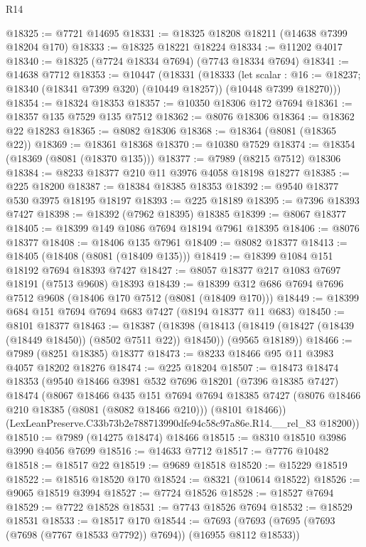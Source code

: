 \begin{lexlean}{R14}
\begin{coremodule}
@18325 := @7721 @14695
@18331 := @18325 @18208 @18211 (@14638 @7399 @18204 @170)
@18333 := @18325 @18221 @18224
@18334 := @11202 @4017
@18340 := @18325 (@7724 @18334 @7694) (@7743 @18334 @7694)
@18341 := @14638 @7712
@18353 := @10447
    (@18331
      (@18333
        (let scalar : @16 := @18237; @18340 (@18341 @7399 @320) (@10449 @18257))
        (@10448 @7399 @18270)))
@18354 := @18324 @18353
@18357 := @10350 @18306 @172 @7694
@18361 := @18357 @135 @7529 @135 @7512
@18362 := @8076 @18306
@18364 := @18362 @22 @18283
@18365 := @8082 @18306
@18368 := @18364 (@8081 (@18365 @22))
@18369 := @18361 @18368
@18370 := @10380 @7529
@18374 := @18354 (@18369 (@8081 (@18370 @135)))
@18377 := @7989 (@8215 @7512) @18306
@18384 := @8233 @18377 @210 @11 @3976 @4058 @18198 @18277
@18385 := @225 @18200
@18387 := @18384 @18385 @18353
@18392 := @9540 @18377 @530 @3975 @18195 @18197
@18393 := @225 @18189
@18395 := @7396 @18393 @7427
@18398 := @18392 (@7962 @18395) @18385
@18399 := @8067 @18377
@18405 := @18399 @149 @1086 @7694 @18194 @7961 @18395
@18406 := @8076 @18377
@18408 := @18406 @135 @7961
@18409 := @8082 @18377
@18413 := @18405 (@18408 (@8081 (@18409 @135)))
@18419 := @18399 @1084 @151 @18192 @7694 @18393 @7427
@18427 := @8057 @18377 @217 @1083 @7697 @18191 (@7513 @9608) @18393
@18439 := @18399 @312 @686 @7694 @7696 @7512 @9608 (@18406 @170 @7512 (@8081 (@18409 @170)))
@18449 := @18399 @684 @151 @7694 @7694 @683 @7427 (@8194 @18377 @11 @683)
@18450 := @8101 @18377
@18463 := @18387
    (@18398
      (@18413 (@18419 (@18427 (@18439 (@18449 @18450)) (@8502 @7511 @22)) @18450))
      (@9565 @18189))
@18466 := @7989 (@8251 @18385) @18377
@18473 := @8233 @18466 @95 @11 @3983 @4057 @18202 @18276
@18474 := @225 @18204
@18507 := @18473
    @18474
    @18353
    (@9540
      @18466
      @3981
      @532
      @7696
      @18201
      (@7396 @18385 @7427)
      @18474
      (@8067
        @18466
        @435
        @151
        @7694
        @7694
        @18385
        @7427
        (@8076 @18466 @210 @18385 (@8081 (@8082 @18466 @210)))
        (@8101 @18466))
      (LexLeanPreserve.C33b73b2e788713990dfe94c58c97a86e.R14.__rel_83 @18200))
@18510 := @7989 (@14275 @18474) @18466
@18515 := @8310 @18510 @3986 @3990 @4056 @7699
@18516 := @14633 @7712
@18517 := @7776 @10482
@18518 := @18517 @22
@18519 := @9689 @18518
@18520 := @15229 @18519
@18522 := @18516 @18520 @170
@18524 := @8321 (@10614 @18522)
@18526 := @9065 @18519 @3994
@18527 := @7724 @18526
@18528 := @18527 @7694
@18529 := @7722 @18528
@18531 := @7743 @18526 @7694
@18532 := @18529 @18531
@18533 := @18517 @170
@18544 := @7693 (@7693 (@7695 (@7693 (@7698 (@7767 @18533 @7792)) @7694)) (@16955 @8112 @18533))

\end{coremodule}
\end{lexlean}
